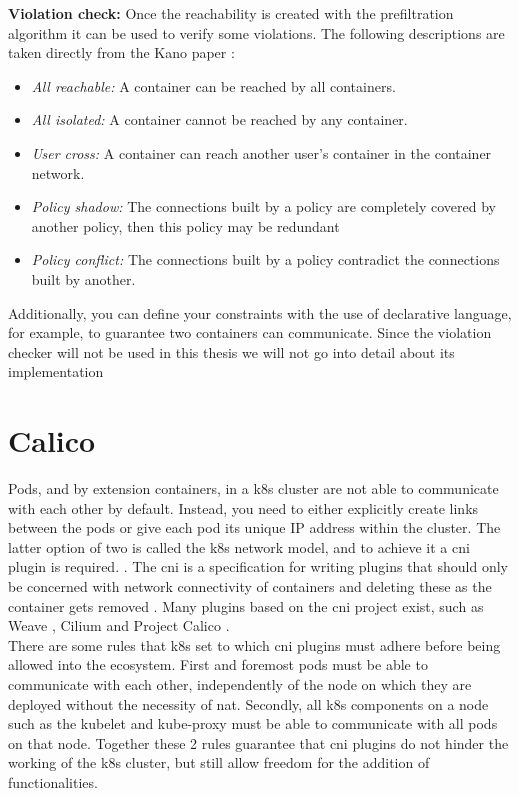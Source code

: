 \textbf{Violation check:} \label{kano:violationcheck} Once the reachability is created with the prefiltration algorithm it can be used to verify some violations. The following descriptions are taken directly from the Kano paper \cite{kano}:
\begin{itemize}
    \renewcommand{\labelitemi}{\scriptsize$\blacksquare$}
    \item \textit{All reachable:} A container can be reached by all containers.
    \item \textit{All isolated:} A container cannot be reached by any container.
    \item \textit{User cross:} A container can reach another user’s container in the container network.
    \item \textit{Policy shadow:} The connections built by a policy are completely covered by another policy, then this policy may be redundant
    \item \textit{Policy conflict:} The connections built by a policy contradict the connections built by another.
\end{itemize}
Additionally, you can define your constraints with the use of declarative language, for example, to guarantee two containers can communicate. Since the violation checker will not be used in this thesis we will not go into detail about its implementation
\\[10pt]


\section{Calico}\label{sec:calico}

Pods, and by extension containers, in a \acrshort{k8s} cluster are not able to communicate with each other by default. Instead, you need to either explicitly create links between the pods or give each pod its unique IP address within the cluster. The latter option of two is called the \acrshort{k8s} network model, and to achieve it a \acrfull{cni} plugin is required. \cite{k8scni} \cite{k8snetworkmodel}. The \acrshort{cni} is a specification for writing plugins that should only be concerned with network connectivity of containers and deleting these as the container gets removed \cite{cni}. Many plugins based on the \acrshort{cni} project exist, such as Weave \cite{weave}, Cilium \cite{cilium} and Project Calico \cite{calico}.
\\[10pt]

There are some rules that \acrshort{k8s} set to which \acrshort{cni} plugins must adhere before being allowed into the ecosystem. First and foremost pods must be able to communicate with each other, independently of the node on which they are deployed without the necessity of \acrfull{nat}. Secondly, all \acrshort{k8s} components on a node such as the kubelet and kube-proxy must be able to communicate with all pods on that node. Together these 2 rules guarantee that \acrshort{cni} plugins do not hinder the working of the \acrshort{k8s} cluster, but still allow freedom for the addition of functionalities.
\\[10pt]

